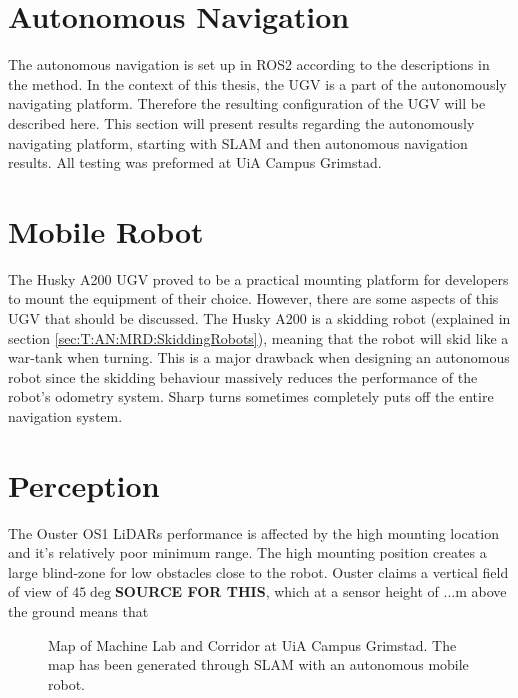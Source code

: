 \section{Autonomous Navigation} \label{sec:R&D:AutonomousNavigaion}
The autonomous navigation is set up in ROS2 according to the descriptions in the method. In the context of this thesis, the UGV is a part of the autonomously navigating platform. Therefore the resulting configuration of the UGV will be described here. This section will present results regarding the autonomously navigating platform, starting with SLAM and then autonomous navigation results. All testing was preformed at UiA Campus Grimstad.

\section{Mobile Robot}\label{sec:R&D:Mobile Robot}
The Husky A200 UGV proved to be a practical mounting platform for developers to mount the equipment of their choice. However, there are some aspects of this UGV that should be discussed. The Husky A200 is a skidding robot (explained in section \ref{sec:T:AN:MRD:SkiddingRobots}), meaning that the robot will skid like a war-tank when turning. This is a major drawback when designing an autonomous robot since the skidding behaviour massively reduces the performance of the robot's odometry system. Sharp turns sometimes completely puts off the entire navigation system. 


\section{Perception}
The Ouster OS1 LiDARs performance is affected by the high mounting location and it's relatively poor minimum range. The high mounting position creates a large blind-zone for low obstacles close to the robot. Ouster claims a vertical field of view of $45\deg$\textbf{SOURCE FOR THIS}, which at a sensor height of ...m above the ground means that 

\begin{figure}[ht]
  \centering
  
  \caption{Map of Machine Lab and Corridor at UiA Campus Grimstad. The map has been generated through SLAM with an autonomous mobile robot.}
  \label{fig:R&D:AN:SLAM:figUiaMap}
\end{figure}


